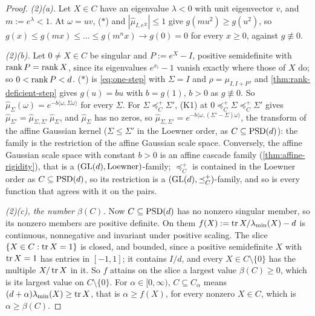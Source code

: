 \begin{proof}
\emph{(2)(a).} Let $X \in C$ have an eigenvalue $\lambda < 0$ with unit eigenvector $v$, and $m := e^\lambda < 1$.
At $\omega = uv$, ($\ast$) and $|\widehat\mu_{I,e^X}| \le 1$ give $g(mu^2) \ge g(u^2)$, so $g(x) \le g(mx) \le
\dots \le g(m^nx) \to g(0) = 0$ for every $x \ge 0$, against $g \not\equiv 0$.

\emph{(2)(b).} Let $0 \ne X \in C$ be singular and $P := e^X - I$, positive semidefinite with $\operatorname{rank} P =
\operatorname{rank} X$, since its eigenvalues $e^{x_i} - 1$ vanish exactly where those of $X$ do; so $0 < \operatorname{rank} P < d$. ($\ast$)
is \ref{eq:one-step} with $\Sigma = I$ and $\rho = \mu_{I,I+P}$, and \ref{thm:rank-deficient-step} gives
$g(u) = bu$ with $b = g(1)$, $b > 0$ as $g \not\equiv 0$. So $\widehat\mu_\Sigma(\omega) =
e^{-b\langle\omega,\Sigma\omega\rangle}$ for every $\Sigma$. For $\Sigma \preceq^+_C \Sigma'$, (K1) at
$0 \preceq^+_C \Sigma \preceq^+_C \Sigma'$ gives $\widehat\mu_{\Sigma'} = \widehat\mu_{\Sigma,\Sigma'}\,\widehat\mu_\Sigma$,
and $\widehat\mu_\Sigma$ has no zeros, so $\widehat\mu_{\Sigma,\Sigma'} = e^{-b\langle\omega,(\Sigma'-\Sigma)\omega\rangle}$,
the transform of the affine Gaussian kernel ($\Sigma \le \Sigma'$ in the Loewner order, as
$C \subseteq \mathrm{PSD}(d)$): the family is the restriction of the affine Gaussian scale space. Conversely, the affine
Gaussian scale space with constant $b > 0$ is an affine cascade family (\ref{thm:affine-rigidity}), that is a
$(\mathrm{GL}(d), \text{Loewner})$-family; $\preceq^+_C$ is contained in the Loewner order as $C \subseteq \mathrm{PSD}(d)$, so
its restriction is a $(\mathrm{GL}(d), \preceq^+_C)$-family, and so is every function that agrees with it on the pairs.

\emph{(2)(c), the number $\beta(C)$.} Now $C \subseteq \mathrm{PSD}(d)$ has no nonzero singular member, so its nonzero
members are positive definite. On them $f(X) := \operatorname{tr} X/\lambda_{\min}(X) - d$ is continuous,
nonnegative and invariant under positive scaling. The slice $\{X \in C : \operatorname{tr} X = 1\}$ is closed, and bounded,
since a positive semidefinite $X$ with $\operatorname{tr} X = 1$ has entries in $[-1, 1]$; it contains $I/d$, and every
$X \in C \setminus \{0\}$ has the multiple $X/\operatorname{tr} X$ in it. So $f$ attains on the slice a largest value
$\beta(C) \ge 0$, which is its largest value on $C \setminus \{0\}$. For $\alpha \in [0, \infty)$,
$C \subseteq C_\alpha$ means $(d+\alpha)\lambda_{\min}(X) \ge \operatorname{tr} X$, that is $\alpha \ge f(X)$, for every nonzero
$X \in C$, which is $\alpha \ge \beta(C)$.


\end{proof}
